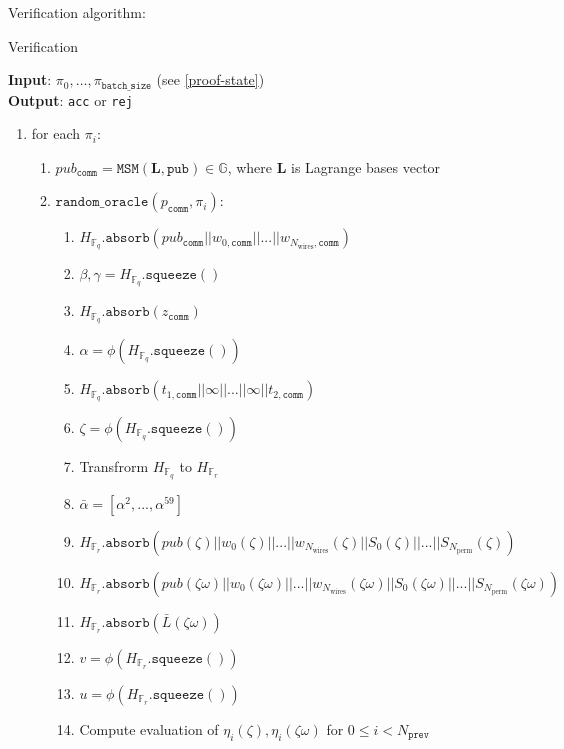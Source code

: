 Verification algorithm:
\begin{algorithm}[H]
\caption{Verification}
\textbf{Input}: $\pi_0, \dots, \pi_{\texttt{batch\_size}}$ (see \ref{proof-state}) \\
\textbf{Output}: \texttt{acc} or \texttt{rej}
\begin{enumerate}
	\item for each $\pi_i$:
	\begin{enumerate}
		\item $pub_{\texttt{comm}} = \texttt{MSM}(\textbf{L}, \texttt{pub}) \in \mathbb{G}$, where $\textbf{L}$ is Lagrange bases vector
		\item $\texttt{random\_oracle}(p_{\texttt{comm}}, \pi_i)$:
		\begin{enumerate}
			\item $H_{\mathbb{F}_q}.\texttt{absorb}(pub_{\texttt{comm}} || w_{0, \texttt{comm}} || ... || w_{N_{\text{wires}}, \texttt{comm}})$
			\item $\beta, \gamma = H_{\mathbb{F}_q}.\texttt{squeeze}()$
			\item $H_{\mathbb{F}_q}.\texttt{absorb}(z_{\texttt{comm}})$
			\item $\alpha = \phi(H_{\mathbb{F}_q}.\texttt{squeeze}())$
			\item $H_{\mathbb{F}_q}.\texttt{absorb}(t_{1, \texttt{comm}} || \infty || ... || \infty || t_{2, \texttt{comm}})$
			\item $\zeta = \phi(H_{\mathbb{F}_q}.\texttt{squeeze}())$
			\item Transfrorm $H_{\mathbb{F}_q}$ to $H_{\mathbb{F}_r}$
			\item $\bar{\alpha} = [\alpha^2, ..., \alpha^59]$
			\item $H_{\mathbb{F}_r}.\texttt{absorb}(pub(\zeta) || w_{0}(\zeta) || ... || w_{N_{\text{wires}}}(\zeta) 
				|| S_0(\zeta) || ... || S_{N_{\text{perm}}}(\zeta))$
			\item $H_{\mathbb{F}_r}.\texttt{absorb}(pub(\zeta\omega) || w_{0}(\zeta\omega) || ... || w_{N_{\text{wires}}}(\zeta\omega) 
				|| S_0(\zeta\omega) || ... || S_{N_{\text{perm}}}(\zeta\omega))$
			\item $H_{\mathbb{F}_r}.\texttt{absorb}(\bar{L}(\zeta\omega))$
			\item $v = \phi(H_{\mathbb{F}_r}.\texttt{squeeze}())$
			\item $u = \phi(H_{\mathbb{F}_r}.\texttt{squeeze}())$
			\item Compute evaluation of $\eta_i(\zeta), \eta_i(\zeta\omega)$ for $0 \leq i < N_{\texttt{prev}}$

\end{enumerate}
\end{enumerate}
\end{enumerate}
\end{algorithm}
